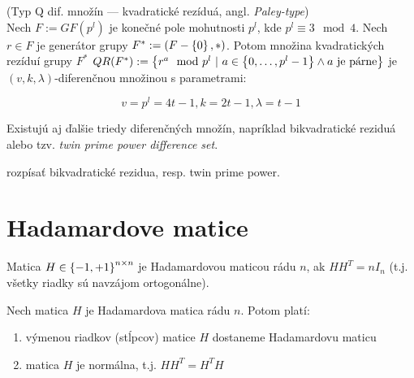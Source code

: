 \begin{theorem_hard}{(Typ Q dif. množín --- kvadratické rezíduá, angl. \emph{Paley-type})}\\
Nech $F := GF(p^l)$ je konečné pole mohutnosti $p^l$, kde $p^l \equiv 3 \mod 4$. 
Nech $r \in F$ je generátor grupy $F^\ast := (F-\left\{0\right\}, \ast)$. 
Potom množina kvadratických rezíduí grupy $F^*$ $QR(F^*) := \left\{r^a \mod p^l ~|~ a \in \left\{0, \ldots, p^l-1\right\} \wedge a~\text{je párne} \right\}$
je $(v, k, \lambda)$-diferenčnou množinou s parametrami:

$$v = p^l = 4t-1, k = 2t - 1, \lambda = t-1$$

\end{theorem_hard}

\begin{remark}

Existujú aj ďalšie triedy diferenčných množín, napríklad bikvadratické reziduá alebo tzv. \emph{twin prime power difference set}.

\end{remark}

\TODO rozpísať bikvadratické rezidua, resp. twin prime power.

\section{Hadamardove matice}

\begin{definition}
Matica $H \in \left\{-1, +1\right\}^{n \times n}$ je Hadamardovou maticou rádu $n$, ak $HH^T = nI_n$ (t.j. všetky riadky sú navzájom ortogonálne).
\end{definition}

\begin{theorem}
Nech matica $H$ je Hadamardova matica rádu $n$. Potom platí:
\begin{enumerate}
    \item výmenou riadkov (stĺpcov) matice $H$ dostaneme Hadamardovu maticu
    \item matica $H$ je normálna, t.j. $HH^T = H^T H$
\end{enumerate}
\end{theorem}

